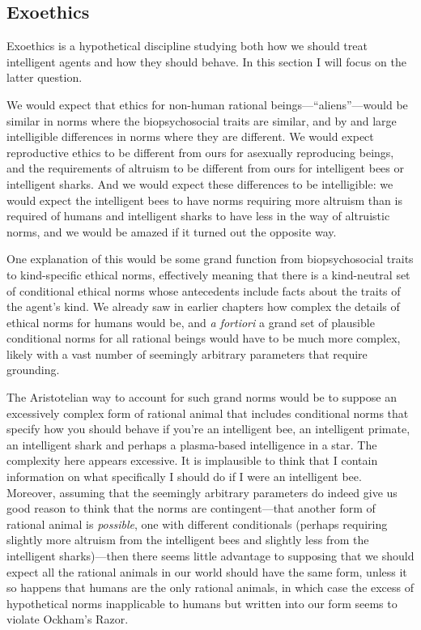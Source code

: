 \subsection{Exoethics}
Exoethics is a hypothetical discipline studying both how we should treat intelligent agents and how they should behave.
In this section I will focus on the latter question.

We would expect that ethics for non-human rational beings---``aliens''---would be similar in norms 
where the biopsychosocial traits are similar, and by and large intelligible differences in norms where they are 
different. We would expect reproductive ethics to be different from ours for asexually reproducing beings, and the 
requirements of altruism to be different from ours for intelligent bees or intelligent sharks. And we would expect 
these differences to be intelligible: we would expect the intelligent bees to have norms requiring more altruism than
is required of humans and intelligent sharks to have less in the way of altruistic norms, and we would be amazed if 
it turned out the opposite way.

One explanation of this would be some grand function from biopsychosocial traits to kind-specific ethical norms, 
effectively meaning that there is a kind-neutral set of conditional ethical norms whose antecedents include facts
about the traits of the agent's kind. We already saw in earlier chapters how complex the details of ethical 
norms for humans would be, and \textit{a fortiori} a grand set of plausible conditional norms for all rational beings 
would have to be much more complex, likely with a vast number of seemingly arbitrary parameters that require grounding.

The Aristotelian way to account for such grand norms would be to suppose an excessively complex form of rational animal that 
includes conditional norms that specify how you should behave if you're an intelligent bee, an intelligent primate, 
an intelligent shark and perhaps a plasma-based intelligence in a star. The complexity here appears excessive. It is 
implausible to think that I contain information on what specifically I should do if I were an intelligent bee.
Moreover, assuming that the seemingly arbitrary parameters do indeed give us good reason to think that the norms 
are contingent---that another form of rational animal is \textit{possible}, one with different conditionals (perhaps requiring
slightly more altruism from the intelligent bees and slightly less from the intelligent sharks)---then there seems 
little advantage to supposing that we should expect all the rational animals in our world should have the same 
form, unless it so happens that humans are the only rational animals, in which case the excess of hypothetical norms 
inapplicable to humans but written into our form seems to violate Ockham's Razor.

